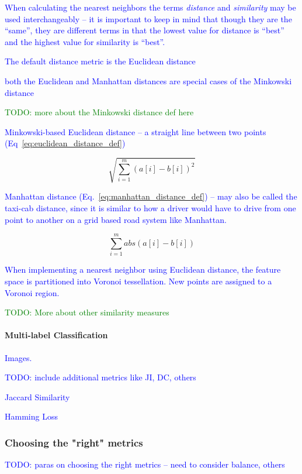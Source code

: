 \textcolor{blue}{When calculating the nearest neighbors the terms \textit{distance} and \textit{similarity} may be used interchangeably -- it is important to keep in mind that though they are the ``same'', they are different terms in that the lowest value for distance is ``best'' and the highest value for similarity is ``best''.}

\textcolor{blue}{The default distance metric is the Euclidean distance}

\textcolor{blue}{both the Euclidean and Manhattan distances are special cases of the Minkowski distance}

\textcolor{green}{TODO: more about the Minkowski distance def here}

\textcolor{blue}{Minkowski-based Euclidean distance -- a straight line between two points (Eq~\ref{eq:euclidean_distance_def})}

\begin{equation}
{\sqrt{\sum_{i=1}^{m}{{(a[i] - b[i])}^2}}}
\label{eq:euclidean_distance_def}
\end{equation}


\textcolor{blue}{Manhattan distance (Eq.~\ref{eq:manhattan_distance_def}) -- may also be called the taxi-cab distance, since it is similar to how a driver would have to drive from one point to another on a grid based road system like Manhattan.}

\begin{equation}
{\sum_{i=1}^{m}{abs(a[i] - b[i])}}
\label{eq:manhattan_distance_def}
\end{equation}

\textcolor{blue}{When implementing a nearest neighbor using Euclidean distance, the feature space is partitioned into {Voronoi tessellation}. New points are assigned to a {Voronoi region}.}

\textcolor{green}{TODO: More about other similarity measures}




\paragraph{Multi-label Classification}

\textcolor{blue}{Images.}

\textcolor{blue}{TODO: include additional metrics like JI, DC, others}

\textcolor{blue}{Jaccard Similarity}

\textcolor{blue}{Hamming Loss}





\subsubsection{Choosing the "right" metrics}

\textcolor{blue}{TODO: paras on choosing the right metrics -- need to consider balance, others}



